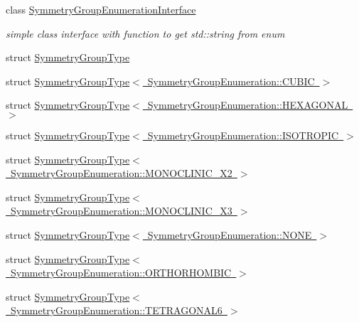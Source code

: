 \begin{DoxyCompactItemize}
class \mbox{\hyperlink{structmpc_1_1core_1_1_symmetry_group_enumeration_interface}{Symmetry\+Group\+Enumeration\+Interface}}
\begin{DoxyCompactList}\small\item\em simple class interface with function to get std\+::string from enum \end{DoxyCompactList}\item 
struct \mbox{\hyperlink{structmpc_1_1core_1_1_symmetry_group_type}{Symmetry\+Group\+Type}}
\item 
struct \mbox{\hyperlink{structmpc_1_1core_1_1_symmetry_group_type_3_01_symmetry_group_enumeration_1_1_c_u_b_i_c_01_4}{Symmetry\+Group\+Type$<$ Symmetry\+Group\+Enumeration\+::\+C\+U\+B\+I\+C $>$}}
\item 
struct \mbox{\hyperlink{structmpc_1_1core_1_1_symmetry_group_type_3_01_symmetry_group_enumeration_1_1_h_e_x_a_g_o_n_a_l_01_4}{Symmetry\+Group\+Type$<$ Symmetry\+Group\+Enumeration\+::\+H\+E\+X\+A\+G\+O\+N\+A\+L $>$}}
\item 
struct \mbox{\hyperlink{structmpc_1_1core_1_1_symmetry_group_type_3_01_symmetry_group_enumeration_1_1_i_s_o_t_r_o_p_i_c_01_4}{Symmetry\+Group\+Type$<$ Symmetry\+Group\+Enumeration\+::\+I\+S\+O\+T\+R\+O\+P\+I\+C $>$}}
\item 
struct \mbox{\hyperlink{structmpc_1_1core_1_1_symmetry_group_type_3_01_symmetry_group_enumeration_1_1_m_o_n_o_c_l_i_n_i_c___x2_01_4}{Symmetry\+Group\+Type$<$ Symmetry\+Group\+Enumeration\+::\+M\+O\+N\+O\+C\+L\+I\+N\+I\+C\+\_\+\+X2 $>$}}
\item 
struct \mbox{\hyperlink{structmpc_1_1core_1_1_symmetry_group_type_3_01_symmetry_group_enumeration_1_1_m_o_n_o_c_l_i_n_i_c___x3_01_4}{Symmetry\+Group\+Type$<$ Symmetry\+Group\+Enumeration\+::\+M\+O\+N\+O\+C\+L\+I\+N\+I\+C\+\_\+\+X3 $>$}}
\item 
struct \mbox{\hyperlink{structmpc_1_1core_1_1_symmetry_group_type_3_01_symmetry_group_enumeration_1_1_n_o_n_e_01_4}{Symmetry\+Group\+Type$<$ Symmetry\+Group\+Enumeration\+::\+N\+O\+N\+E $>$}}
\item 
struct \mbox{\hyperlink{structmpc_1_1core_1_1_symmetry_group_type_3_01_symmetry_group_enumeration_1_1_o_r_t_h_o_r_h_o_m_b_i_c_01_4}{Symmetry\+Group\+Type$<$ Symmetry\+Group\+Enumeration\+::\+O\+R\+T\+H\+O\+R\+H\+O\+M\+B\+I\+C $>$}}
\item 
struct \mbox{\hyperlink{structmpc_1_1core_1_1_symmetry_group_type_3_01_symmetry_group_enumeration_1_1_t_e_t_r_a_g_o_n_a_l6_01_4}{Symmetry\+Group\+Type$<$ Symmetry\+Group\+Enumeration\+::\+T\+E\+T\+R\+A\+G\+O\+N\+A\+L6 $>$}}

\end{DoxyCompactItemize}
